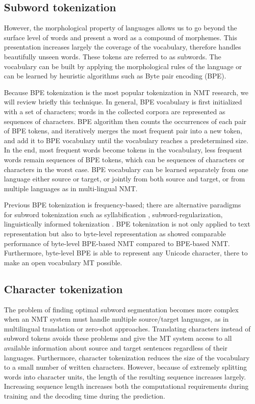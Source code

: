 \subsection{Subword tokenization}
However, the morphological property of languages allows us to go beyond the surface level of words and present a word as a compound of morphemes. This presentation increases largely the coverage of the vocabulary, therefore handles beautifully unseen words. These tokens are referred to as subwords. The vocabulary can be built by applying the morphological rules of the language or can be learned by heuristic algorithms such as Byte pair encoding (BPE)\citep{sennrich16neural,gage94anew}. 

Because BPE tokenization is the most popular tokenization in NMT research, we will review briefly this technique. In general, BPE vocabulary is first initialized with a set of characters; words in the collected corpora are represented as sequences of characters. BPE algorithm then counts the occurrences of each pair of BPE tokens, and iteratively merges the most frequent pair into a new token, and add it to BPE vocabulary until the vocabulary reaches a predetermined size. In the end, most frequent words become tokens in the vocabulary, less frequent words remain sequences of BPE tokens, which can be sequences of characters or characters in the worst case. BPE vocabulary can be learned separately from one language either source or target, or jointly from both source and target, or from multiple languages as in multi-lingual NMT. 

Previous BPE tokenization is frequency-based; there are alternative paradigms for subword tokenization such as syllabification \cite{assylbekov17syllable}, subword-regularization\cite{taku18subword}, linguistically informed tokenization \cite{ataman17linguistically,huck17target,machcek18morphological}. BPE tokenization is not only applied to text representation but also to byte-level representation as \cite{wang19neural} showed comparable performance of byte-level BPE-based NMT compared to BPE-based NMT. Furthermore, byte-level BPE is able to represent any Unicode character, there to make an open vocabulary MT possible.
\subsection{Character tokenization}
The problem of finding optimal subword segmentation becomes more complex
when an NMT system must handle multiple source/target languages, as in multilingual translation or zero-shot approaches. Translating characters instead of subword tokens avoids these problems and give the MT system
access to all available information about source and target sentences regardless of their languages. Furthermore, character tokenization reduces the size of the vocabulary to a small number of written characters. However, because of extremely splitting words into character units, the length of the resulting sequence increases largely. Increasing sequence length increases both the computational requirements during training and the decoding time during the prediction. 

